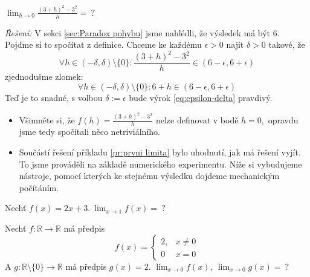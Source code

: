 \begin{příklad}\label{pr:prvni limita}
$\lim_{h\to 0}\frac{(3+h)^{2}-3^{2}}{h}=\ ?$\par
\textit{Řešení:} V sekci \ref{sec:Paradox pohybu} jsme nahlédli, že výsledek má být 6. Pojďme si to spočítat z definice. Chceme ke každému $\epsilon>0$ najít $\delta>0$ takové, že
\begin{equation*}
	\forall h\in (-\delta,\delta)\setminus\{0\}\colon \frac{(3+h)^{2}-3^{2}}{h}\in (6-\epsilon,6+\epsilon)
\end{equation*}
zjednodušme zlomek:
\begin{equation}
	\forall h\in (-\delta,\delta)\setminus\{0\}\colon 6+h\in (6-\epsilon,6+\epsilon)\label{eq:epsilon-delta}
\end{equation}
Teď je to snadné, s volbou $\delta:= \epsilon$ bude výrok \ref{eq:epsilon-delta} pravdivý.
\end{příklad}
\begin{poznámka}\leavevmode
\begin{itemize}
	\item Všimněte si, že $f(h)=\frac{(3+h)^{2}-3^{2}}{h}$ nelze definovat v bodě $h=0,$ opravdu jsme tedy spočítali něco netriviálního.
	\item Součástí řešení příkladu \ref{pr:prvni limita} bylo uhodnutí, jak má řešení vyjít. To jsme prováděli na základě numerického experimentu. Níže si vybudujeme nástroje, pomocí kterých ke stejnému výsledku dojdeme mechanickým počítáním.
\end{itemize}
\end{poznámka}

\begin{úloha}
	Nechť $f(x)=2x+3.\ \lim_{x\to 1}f(x)=\ ?$
\end{úloha}

\begin{úloha}
  Nechť $f\colon \mathbb{R}\to \mathbb{R}$ má předpis
  \begin{equation*}
	  f(x)=\left\{
	\begin{matrix}
		2, & x\neq 0 \\
		0  & x=0
	\end{matrix}\right.
  \end{equation*}
  A $g\colon \mathbb{R}\setminus \{0\}\to \mathbb{R}$ má předpis $g(x)=2.$ $\lim_{x\to 0}f(x),\ \lim_{x\to 0}g(x)=\ ?$
\end{úloha}

